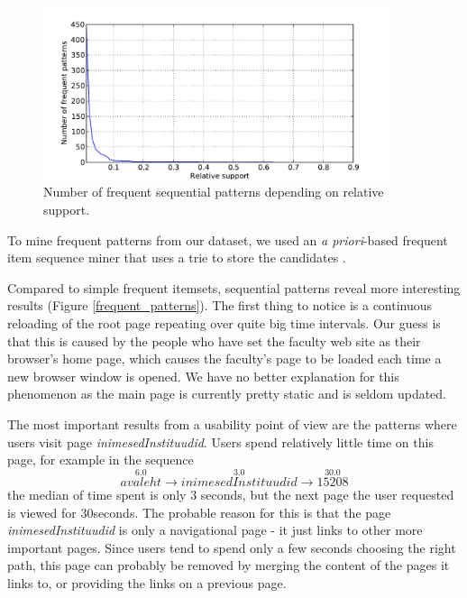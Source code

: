 \documentclass[12pt, english,a4paper]{article}
\begin{document}
\begin{figure}[H]
  \centering
      \includegraphics[width=0.9\textwidth]{sequential_itemset_count}
  \caption{Number of frequent sequential patterns depending on relative support.}
\end{figure}


To mine frequent patterns from our dataset, we used an \emph{a priori}-based frequent item sequence miner that uses a trie to store the candidates \cite{seq_apriori}.


Compared to simple frequent itemsets, sequential patterns reveal more interesting results (Figure \ref{frequent_patterns}). The first thing to notice is a continuous reloading of the root page repeating over quite big time intervals. Our guess is that this is caused by the people who have set the faculty web site as their browser's home page, which causes the faculty's page to be loaded each time a new browser window is opened. We have no better explanation for this phenomenon as the main page is currently pretty static and is seldom updated.

The most important results from a usability point of view are the patterns where users visit page \emph{inimesedInstituudid}. Users spend relatively little time on this page, for example in the sequence
\[ 
\overset{6.0}{avaleht} \rightarrow \overset{3.0}{inimesedInstituudid} \rightarrow \overset{30.0}{15208} 
\]
the median of time spent is only 3 seconds, but the next page the user requested is viewed for 30seconds. The probable reason for this is that the page \emph{inimesedInstituudid} is only a navigational page - it just links to other more important pages. Since users tend to spend only a few seconds choosing the right path, this page can probably be removed by merging the content of the pages it links to, or providing the links on a previous page.
\end{document}
